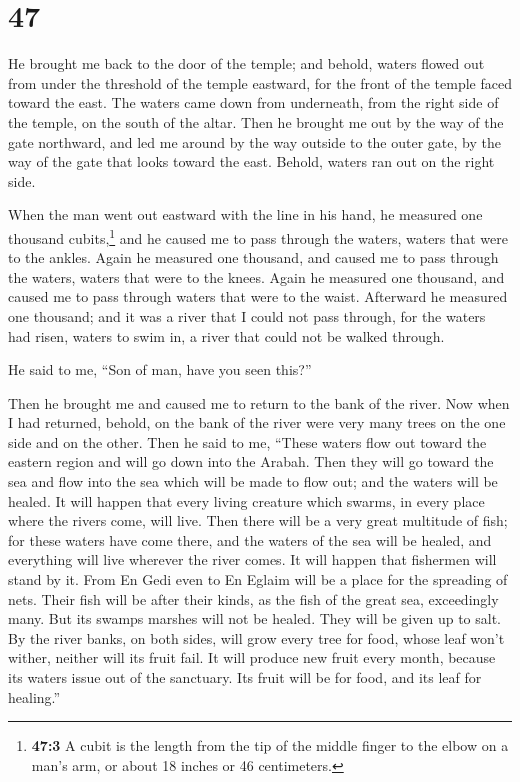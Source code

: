 \hypertarget{section-46}{%
\section{47}\label{section-46}}

 He brought me back to the door of the temple; and behold,
waters flowed out from under the threshold of the temple eastward, for
the front of the temple faced toward the east. The waters came down from
underneath, from the right side of the temple, on the south of the
altar.  Then he brought me out by the way of the gate
northward, and led me around by the way outside to the outer gate, by
the way of the gate that looks toward the east. Behold, waters ran out
on the right side.

 When the man went out eastward with the line in his hand,
he measured one thousand cubits,\footnote{\textbf{47:3} A cubit is the
  length from the tip of the middle finger to the elbow on a man's arm,
  or about 18 inches or 46 centimeters.} and he caused me to pass
through the waters, waters that were to the ankles.  Again
he measured one thousand, and caused me to pass through the waters,
waters that were to the knees. Again he measured one thousand, and
caused me to pass through waters that were to the waist. 
Afterward he measured one thousand; and it was a river that I could not
pass through, for the waters had risen, waters to swim in, a river that
could not be walked through.

 He said to me, ``Son of man, have you seen this?''

Then he brought me and caused me to return to the bank of the river.
 Now when I had returned, behold, on the bank of the river
were very many trees on the one side and on the other. 
Then he said to me, ``These waters flow out toward the eastern region
and will go down into the Arabah. Then they will go toward the sea and
flow into the sea which will be made to flow out; and the waters will be
healed.  It will happen that every living creature which
swarms, in every place where the rivers come, will live. Then there will
be a very great multitude of fish; for these waters have come there, and
the waters of the sea will be healed, and everything will live wherever
the river comes.  It will happen that fishermen will
stand by it. From En Gedi even to En Eglaim will be a place for the
spreading of nets. Their fish will be after their kinds, as the fish of
the great sea, exceedingly many.  But its swamps marshes
will not be healed. They will be given up to salt.  By
the river banks, on both sides, will grow every tree for food, whose
leaf won't wither, neither will its fruit fail. It will produce new
fruit every month, because its waters issue out of the sanctuary. Its
fruit will be for food, and its leaf for healing.''

